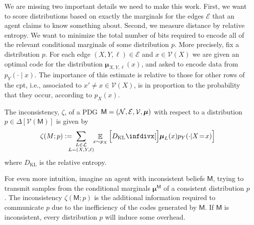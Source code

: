 \documentclass{article}
\def\sheq{\!=\!}
\newcommand{\bmu}{\boldsymbol{\mu}}
\newcommand{\V}{\mathcal V}
\newcommand{\Ed}{\mathcal E}
\newcommand{\sfM}{\mathsf M}
\newcommand{\MN}{PDG}
\numberwithin{equation}{section}
\begin{document}
\begin{notfocus}
 	
 	We are missing two important details we need to make this work. 
 	First, we want to score distributions based on exactly the marginals for the edges $\Ed$ that an agent claims to know something about. 
 	Second, we measure distance by relative entropy.
 	We want to minimize the total number of bits required to encode all of the relevant conditional marginals of some distribution $p$. 
 	More precisely, fix a distribution $p$. For each edge $(X, Y, \ell) \in \Ed$ and $x \in \V(X)$ we are given an optimal code for the distribution $\bmu_{X,Y,\ell}(x)$, and asked to encode data from $p_Y( \cdot \mid x)$. The importance of this estimate is relative to those for other rows of the cpt, i.e., associated to $x' \neq x \in \V(X)$, is in proportion to the probability that they occur, according to $p_X(x)$.
 		
	\begin{defn}\label{def:zeta-score}
		The inconsistency, $\zeta$, of a \MN\ $\sfM = \mnvars[]$ with respect to a distribution $p \in \Delta[\V(\sfM)]$ is given by
		\[
			\zeta(M ; p) := %
			\!\!\!\!\!\sum_{\substack{L \in \cal L\\L = (X,Y, \ell)}}\!\! \mathop{\mathbb E}_{x \sim p_X} \left[\kldiv[\Big]{\bmu_{L}(x) }{ p_Y(\cdot | X \sheq x) } \right]
		\]
		where $D_{\mathrm{KL}}$ is the relative entropy.
	\end{defn}

	For even more intuition,
	imagine an agent with inconsistent beliefs $\sfM$, trying to transmit samples from the conditional marginals $\bmu^\sfM$ of a consistent distribution $p$. The inconsistency $\zeta(\sfM;p)$ is the additional information required to communicate $p$ due to the inefficiency of the codes generated by $\sfM$. If $\sfM$ is inconsistent, every distribution $p$ will induce some overhead.
	

\end{notfocus}
\end{document}
